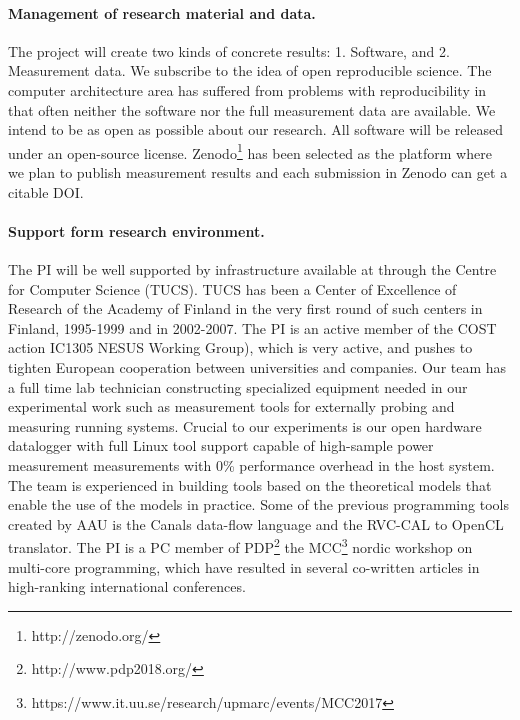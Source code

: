 \documentclass{article}
\begin{document}
\paragraph{Management of research material and data. }
The project will create two kinds of concrete results: 1. Software, and 2. Measurement data. 
We subscribe to the idea of open reproducible science. 
The computer architecture area has suffered from problems with reproducibility in that often neither the software nor the full measurement data are available. 
We intend to be as open as possible about our research. 
All software will be released under an open-source license. 
Zenodo\footnote{http://zenodo.org/} has been selected as the platform where we plan to publish measurement results and each submission in Zenodo can get a citable DOI.

\paragraph{Support form research environment. }
The PI will be well supported by infrastructure available at through the Centre for Computer Science (TUCS).
TUCS has been a Center of Excellence of Research of the Academy of Finland in the very first round of such centers in Finland, 1995-1999 and in 2002-2007. 
The PI is an active member of the COST action IC1305 NESUS Working Group), which is very active, and pushes to tighten European cooperation between universities and companies.
Our team has a full time lab technician constructing specialized equipment needed in our experimental work such as measurement tools for externally probing and measuring running systems. 
Crucial to our experiments is our open hardware datalogger with full Linux tool support capable of high-sample power measurement measurements with 0\% performance overhead in the host system. 
The team is experienced in building tools based on the theoretical models that enable the use of the models in practice. 
Some of the previous programming tools created by AAU is the Canals data-flow language and the RVC-CAL to OpenCL translator. 
The PI is a PC member of PDP\footnote{http://www.pdp2018.org/} the MCC\footnote{https://www.it.uu.se/research/upmarc/events/MCC2017} nordic workshop on multi-core programming, which have resulted in several co-written articles in high-ranking international conferences.
\end{document}
